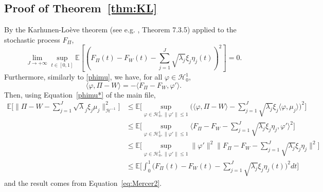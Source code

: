 \documentclass[aos]{imsart}
\theoremstyle{plain}
\theoremstyle{remark}
\newcommand{\1}{1}
\begin{document}
\subsection{Proof of Theorem~\ref{thm:KL}}
By the Karhunen-Lo\`eve theorem (see e.g. \cite{hsing2015theoretical}, Theorem 7.3.5) applied to the stochastic process $F_\Pi$,
\begin{equation}\label{eq:Mercer2}
\lim_{J\to+\infty}\sup_{t\in [0,1]}\mathbb E\left[\left(F_\Pi(t)-F_W(t)-\sum_{j=1}^J\sqrt{\lambda_j}\xi_j\eta_j(t)\right)^2\right]=0.
\end{equation}
Furthermore, similarly to \eqref{phimu}, we have, for all $\varphi\in\mathcal H_0^1$, 
$$\langle \varphi,\Pi-W\rangle=-\langle F_\Pi-F_W,\varphi'\rangle.$$
Then, using Equation~\eqref{phimu*} of the main file,
\begin{align*}
\mathbb E\Bigg[\Big\|\Pi-W-\sum_{j=1}^J\sqrt\lambda_j\xi_j\mu_j\Big\|_{\mathcal H^{-1}}^2\Bigg]&\leq\mathbb E\Bigg[\sup_{\varphi\in\mathcal H_0^1, \|\varphi'\|\leq 1}\Big(\langle \varphi,\Pi-W\rangle-\sum_{j=1}^J\sqrt{\lambda_j}\xi_j\langle \varphi,\mu_j\rangle\Big)^2\Bigg]\\
&\leq\mathbb E\Bigg[\sup_{\varphi\in\mathcal H_0^1, \|\varphi'\|\leq 1}\Big\langle F_\Pi-F_W-\sum_{j=1}^J\sqrt{\lambda_j}\xi_j \eta_j,\varphi'\Big\rangle^2\Bigg]\\
&\leq \mathbb E\Bigg[\sup_{\varphi\in\mathcal H_0^1, \|\varphi'\|\leq 1}\|\varphi'\|^2\Big\| F_\Pi-F_W-\sum_{j=1}^J\sqrt{\lambda_j}\xi_j \eta_j\Big\|^2\Bigg]\\
&\leq \mathbb E\Bigg[\int_0^1\Big( F_\Pi(t)-F_W(t)-\sum_{j=1}^J\sqrt{\lambda_j}\xi_j \eta_j(t)\Big)^2dt\Bigg]
\end{align*}
and the result comes from  Equation~\eqref{eq:Mercer2}.
\end{document}
